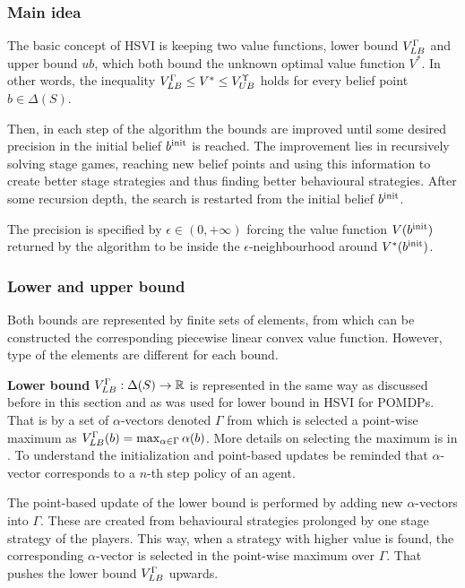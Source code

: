\documentclass[../main.tex]{subfiles}
\begin{document}
\subsubsection{Main idea}\label{standard:osposg:hsvi:idea}
The basic concept of HSVI is keeping two value functions, lower bound $V_{LB}^{\Gamma}$ and upper bound $ub$, which both bound the unknown optimal value function $V^*$.
In other words, the inequality $V_{LB}^{\Gamma} \leq V^* \leq V_{UB}^{\Upsilon}$ holds for every belief point $b \in \Delta(S)$.

Then, in each step of the algorithm the bounds are improved until some desired precision in the initial belief $b^{\text{init}}$ is reached.
The improvement lies in recursively solving stage games, reaching new belief points and using this information to create better stage strategies and thus finding better behavioural strategies.
After some recursion depth, the search is restarted from the initial belief $b^{\text{init}}$.

The precision is specified by $\epsilon \in \left(0, +\infty\right)$ forcing the value function $V(b^{\text{init}})$ returned by the algorithm to be inside the $\epsilon$-neighbourhood around $V^*(b^{\text{init}})$.

\subsubsection{Lower and upper bound}\label{standard:osposg:hsvi:bounds}
Both bounds are represented by finite sets of elements, from which can be constructed the corresponding piecewise linear convex value function.
However, type of the elements are different for each bound.

\textbf{Lower bound} $V_{LB}^{\Gamma} : \Delta(S) \to \mathbb{R}$ is represented in the same way as discussed before in this section and as was used for lower bound in HSVI for POMDPs.
That is by a set of $\alpha$-vectors denoted $\Gamma$ from which is selected a point-wise maximum as $V_{LB}^{\Gamma}(b) = \max_{\alpha \in \Gamma}\alpha(b)$.
More details on selecting the maximum is in .
To understand the initialization and point-based updates be reminded that $\alpha$-vector corresponds to a $n$-th step policy of an agent.

The point-based update of the lower bound is performed by adding new $\alpha$-vectors into $\Gamma$.
These are created from behavioural strategies prolonged by one stage strategy of the players.
This way, when a strategy with higher value is found, the corresponding $\alpha$-vector is selected in the point-wise maximum over $\Gamma$.
That pushes the lower bound $V_{LB}^{\Gamma}$ upwards.
\end{document}
